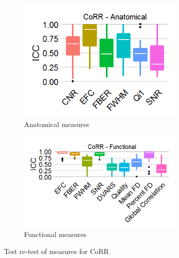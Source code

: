 \documentclass{frontiersSCNS} %
\begin{document}
\begin{figure}[h]
  \centering
     \begin{subfigure}[b]{0.4\textwidth}
       \includegraphics[width=8cm]{fig3_corr_anat_icc_btw}
       \caption{Anatomical measures}
     \end{subfigure}
     \begin{subfigure}[b]{0.4\textwidth}
       \includegraphics[width=8cm]{fig3_corr_func_icc_btw}
       \caption{Functional measures}
     \end{subfigure} 
     \caption{Test re-test of measures for CoRR}
\end{figure}
\end{document}

